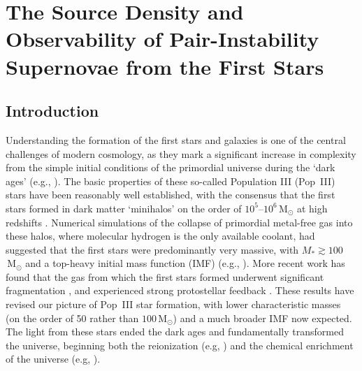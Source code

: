 \documentclass{thesis}
\newcommand{\msun}{\ensuremath{\,\mathrm{M}_{\odot}}\xspace}
\begin{document}
\chapter{The Source Density and Observability of Pair-Instability Supernovae from the First Stars}
\section{Introduction}
Understanding the formation of the first stars and galaxies is one of
the central challenges of modern cosmology, as they mark a significant
increase in complexity from the simple initial conditions of the
primordial universe during the `dark ages' (e.g.,
\citealt{BarkanaLoeb2001, Miralda-Escude2003, Brommetal2009,
  Loeb2010}). The basic properties of these so-called Population III
(Pop~III) stars have been reasonably well established, with the
consensus that the first stars formed in dark matter `minihalos' on
the order of $10^5$--$10^6$\msun at high redshifts
\citep{CouchmanRees1986,HaimanThoulLoeb1996,Tegmarketal1997}.
Numerical simulations of the collapse of primordial metal-free gas
into these halos, where molecular hydrogen is the only available
coolant, had suggested that the first stars were predominantly very
massive, with $M_* \gtrsim100$\msun and a top-heavy initial mass
function (IMF) (e.g., \citealt{BrommCoppiLarson1999,
  BrommCoppiLarson2002, AbelBryanNorman2002, BrommLarson2004,
  Yoshidaetal2006, O'SheaNorman2007}).  More recent work has found
that the gas from which the first stars formed underwent significant
fragmentation \citep{StacyGreifBromm2010, Clarketal2011b,
  Greifetal2011, Greifetal2012}, and experienced strong protostellar
feedback \citep{Hosokawaetal2011, StacyGreifBromm2012}.  These results
have revised our picture of Pop~III star formation, with lower
characteristic masses (on the order of 50 rather than $100$\msun) and
a much broader IMF now expected.  The light from these stars ended the
dark ages and fundamentally transformed the universe, beginning both
the reionization (e.g, \citealt{Meiksin2009}) and the chemical
enrichment of the universe (e.g, \citealt{Karlsson2011}).
\end{document}
